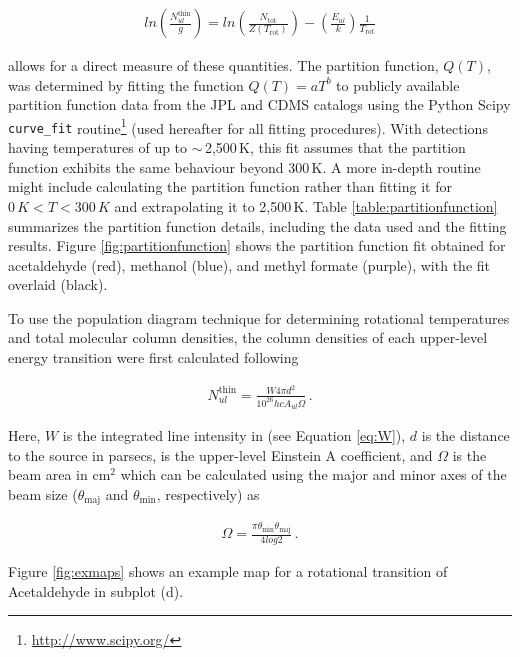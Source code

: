 \documentclass[iop,twocolappendix]{emulateapj}
\begin{document}
\begin{align} \label{eq:popdiagram}
ln \left( \frac{N_{ul}^\mathrm{thin}}{g} \right) = ln \left( \frac{N_{\mathrm{tot}}}{Z(T_\mathrm{rot})} \right) - \left( \frac{E_{ul}}{k} \right) \frac{1}{T_\mathrm{rot}}
\end{align}

{\noindent}allows for a direct measure of these quantities. The partition function, $Q(T)$, was determined by fitting the function $Q(T) = aT^b$ to publicly available partition function data from the JPL and CDMS catalogs using the Python Scipy {\tt curve\_fit} routine\footnote{\url{http://www.scipy.org/}} (used hereafter for all fitting procedures). With detections having temperatures of up to $\sim$\,2,500\,K, this fit assumes that the partition function exhibits the same behaviour beyond 300\,K. A more in-depth routine might include calculating the partition function rather than fitting it for $0\,K < T < 300\,K$ and extrapolating it to 2,500\,K. Table \ref{table:partitionfunction} summarizes the partition function details, including the data used and the fitting results. Figure \ref{fig:partitionfunction} shows the partition function fit obtained for acetaldehyde (red), methanol (blue), and methyl formate (purple), with the fit overlaid (black).

To use the population diagram technique for determining rotational temperatures and total molecular column densities, the column densities of each upper-level energy transition were first calculated following

\begin{align}
N_{ul}^\mathrm{thin} = \frac{W 4{\pi}d^2}{10^{26}hcA_{ul}{\Omega}}\,.
\end{align}

{\noindent}Here, $W$ is the integrated line intensity in {\Jybeamkms} (see Equation \ref{eq:W}), $d$ is the distance to the source in parsecs, {\Aul} is the upper-level Einstein A coefficient, and $\Omega$ is the beam area in cm$^2$ which can be calculated using the major and minor axes of the beam size (${\theta}_\mathrm{maj}$ and ${\theta}_\mathrm{min}$, respectively) as

\begin{align}
\Omega = \frac{{\pi}{\theta}_\mathrm{min}{\theta}_\mathrm{maj}}{4log2}\,.
\end{align}

{\noindent}Figure \ref{fig:exmaps} shows an example {\Nthin} map for a rotational transition of Acetaldehyde in subplot (d). 
\end{document}
